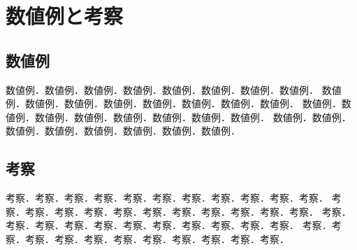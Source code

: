 \chapter{数値例と考察}

\section{数値例}

数値例．数値例．数値例．数値例．数値例．数値例．数値例．数値例．
数値例．数値例．数値例．数値例．数値例．数値例．数値例．数値例．
数値例．数値例．数値例．数値例．数値例．数値例．数値例．数値例．
数値例．数値例．数値例．数値例．数値例．数値例．数値例．数値例．


\section{考察}

考察．考察．考察．考察．考察．考察．考察．考察．考察．考察．考察．
考察．考察．考察．考察．考察．考察．考察．考察．考察．考察．考察．
考察．考察．考察．考察．考察．考察．考察．考察．考察．考察．考察．
考察．考察．考察．考察．考察．考察．考察．考察．考察．考察．考察．
